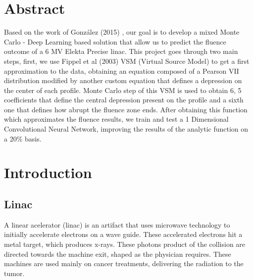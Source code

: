 \documentclass[openany]{article}
\begin{document}
\clearpage\thispagestyle{empty}\null\newpage %
	


\newpage
\thispagestyle{plain}
{
\hypersetup{hidelinks}
\tableofcontents
}

\newpage 

\listoffigures
\listoftables

\newpage 

\thispagestyle{empty}


\thispagestyle{plain}

\section{Abstract}

Based on the work of González (2015) \cite{Gonzalez2015}, our goal is to develop a mixed Monte Carlo - Deep Learning based solution that allow us to predict the fluence outcome of a 6 MV Elekta Precise linac. This project goes through two main steps, first, we use Fippel et al (2003) \cite{Fippel} VSM (Virtual Source Model) to get a first approximation to the data, obtaining an equation composed of a Pearson VII distribution modified by another custom equation that defines a depression on the center of each profile. Monte Carlo step of this VSM is used to obtain 6, 5 coefficients that define the central depression present on the profile and a sixth one that defines how abrupt the fluence zone ends. After obtaining this function which approximates the fluence results, we train and test a 1 Dimensional Convolutional Neural Network, improving the results of the analytic function on a 20\% basis.

    \vspace{2cm}
    





\newpage

\section{Introduction} \label{sec: introduction}

\subsection{Linac}


A linear acelerator (linac) is an artifact that uses microwave technology to initially accelerate electrons on a wave guide. These accelerated electrons hit a metal target, which produces x-rays. These photons product of the collision are directed towards the machine exit, shaped as the physician requires. These machines are used mainly on cancer treatments, delivering the radiation to the tumor.
\end{document}

